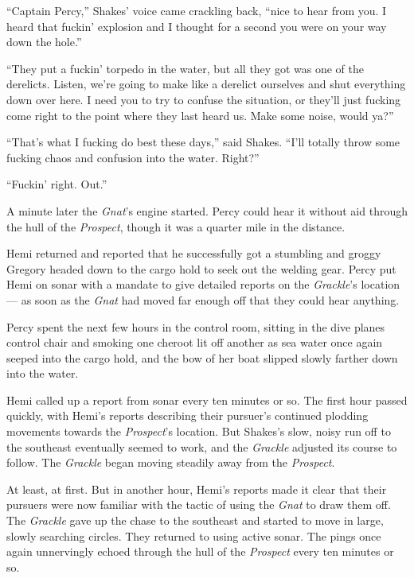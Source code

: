 \documentclass[
]{scrbook}
\begin{document}
``Captain Percy,'' Shakes' voice came crackling back, ``nice to hear
from you. I heard that fuckin' explosion and I thought for a second you
were on your way down the hole.''

``They put a fuckin' torpedo in the water, but all they got was one of
the derelicts. Listen, we're going to make like a derelict ourselves and
shut everything down over here. I need you to try to confuse the
situation, or they'll just fucking come right to the point where they
last heard us. Make some noise, would ya?''

``That's what I fucking do best these days,'' said Shakes. ``I'll
totally throw some fucking chaos and confusion into the water. Right?''

``Fuckin' right. Out.''

A minute later the \emph{Gnat}'s engine started. Percy could hear it
without aid through the hull of the \emph{Prospect}, though it was a
quarter mile in the distance.

Hemi returned and reported that he successfully got a stumbling and
groggy Gregory headed down to the cargo hold to seek out the welding
gear. Percy put Hemi on sonar with a mandate to give detailed reports on
the \emph{Grackle}'s location --- as soon as the \emph{Gnat} had moved
far enough off that they could hear anything.

\bigskip

Percy spent the next few hours in the control room, sitting in the dive
planes control chair and smoking one cheroot lit off another as sea
water once again seeped into the cargo hold, and the bow of her boat
slipped slowly farther down into the water.

Hemi called up a report from sonar every ten minutes or so. The first
hour passed quickly, with Hemi's reports describing their pursuer's
continued plodding movements towards the \emph{Prospect}'s location. But
Shakes's slow, noisy run off to the southeast eventually seemed to work,
and the \emph{Grackle} adjusted its course to follow. The \emph{Grackle}
began moving steadily away from the \emph{Prospect}.

At least, at first. But in another hour, Hemi's reports made it clear
that their pursuers were now familiar with the tactic of using the
\emph{Gnat} to draw them off. The \emph{Grackle} gave up the chase to
the southeast and started to move in large, slowly searching circles.
They returned to using active sonar. The pings once again unnervingly
echoed through the hull of the \emph{Prospect} every ten minutes or so.
\end{document}
